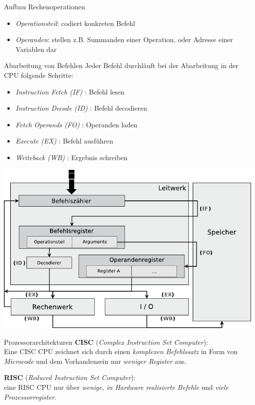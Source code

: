 \documentclass[german]{spicker}
\begin{document}
\begin{bonus}{Aufbau Rechenoperationen}
    \begin{itemize}
        \item \emph{Operationsteil}: codiert konkreten Befehl
        \item \emph{Operanden}: stellen z.B. Summanden einer Operation, oder Adresse einer Variablen dar
    \end{itemize}
\end{bonus}

\begin{bonus}{Abarbeitung von Befehlen}
    Jeder Befehl durchläuft bei der Abarbeitung in der CPU folgende Schritte:
    \begin{itemize}
        \item \emph{Instruction Fetch (IF)} : Befehl lesen
        \item \emph{Instruction Decode (ID)} : Befehl decodieren
        \item \emph{Fetch Operands (FO)} : Operanden laden
        \item \emph{Execute (EX)} : Befehl ausführen
        \item \emph{Writeback (WB)} : Ergebnis schreiben
    \end{itemize}

    \begin{center}
        \includegraphics[]{images/befehlsabarbeitung.pdf}
    \end{center}
\end{bonus}

\begin{defi}{Prozessorarchitekturen}
    \textbf{CISC} (\emph{Complex Instruction Set Computer}):\\
    Eine CISC CPU zeichnet sich durch einen \emph{komplexen Befehlssatz} in Form von \emph{Microcode} und dem Vorhandensein nur \emph{weniger Register} aus.

    \textbf{RISC} (\emph{Reduced Instruction Set Computer}):\\
    eine RISC CPU nur über \emph{wenige, in Hardware realisierte Befehle} und \emph{viele Prozessorregister}.
\end{defi}
\end{document}
